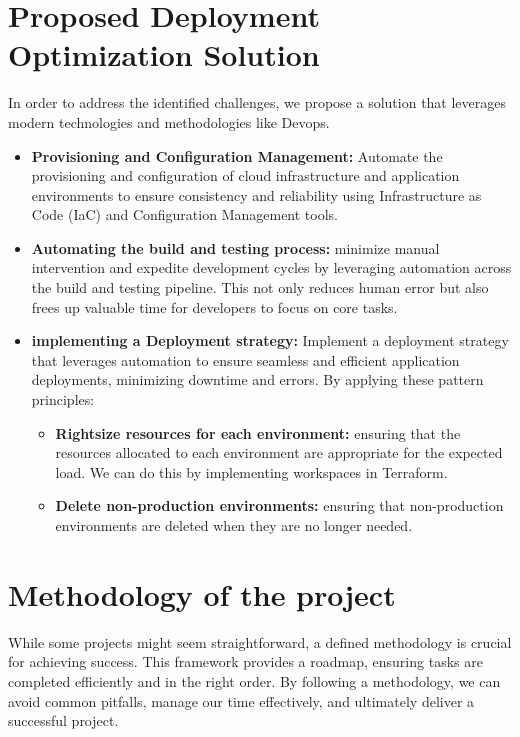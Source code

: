 \section{Proposed Deployment Optimization Solution}
In order to address the identified challenges, we propose a solution that leverages modern technologies and methodologies like Devops.
\begin{itemize}

    \item \textbf{Provisioning and Configuration Management:}
          Automate the provisioning and configuration of cloud infrastructure and application environments to ensure consistency and reliability using Infrastructure as Code (IaC) and Configuration Management tools.

    \item \textbf{Automating the build and testing process:}
          minimize manual intervention and expedite development cycles by leveraging automation across the build and testing pipeline. This not only reduces human error but also frees up valuable time for developers to focus on core tasks.
    \item \textbf{implementing a Deployment strategy:}
          Implement a deployment strategy that leverages automation to ensure seamless and efficient application deployments, minimizing downtime and errors. By applying these pattern principles:
          \begin{itemize}
              \item \textbf{Rightsize resources for each environment:} ensuring that the resources allocated to each environment are appropriate for the expected load. We can do this by implementing workspaces in Terraform.
              \item \textbf{Delete non-production environments:} ensuring that non-production environments are deleted when they are no longer needed.
          \end{itemize}
\end{itemize}

\section{Methodology of the project}
While some projects might seem straightforward, a defined methodology is crucial for achieving success. This framework provides a roadmap, ensuring tasks are completed efficiently and in the right order. By following a methodology, we can avoid common pitfalls, manage our time effectively, and ultimately deliver a successful project.
